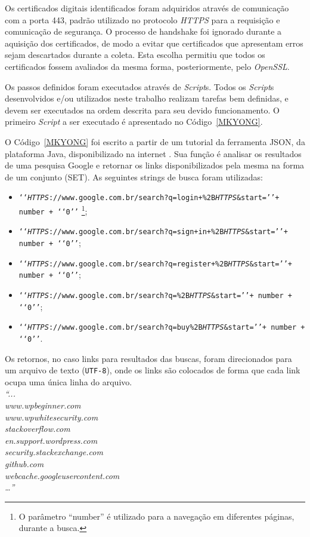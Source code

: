 		Os certificados digitais  identificados foram adquiridos através de comunicação com a porta 443, padrão utilizado no protocolo \textit{HTTPS} para a requisição e comunicação de segurança. O processo de handshake foi ignorado durante a aquisição dos certificados, de modo a evitar que certificados que apresentam erros sejam descartados durante a coleta. Esta escolha permitiu que todos os certificados fossem avaliados da mesma forma, posteriormente, pelo \textit{OpenSSL}.
		
		Os passos definidos foram executados através de \textit{Script}s. Todos os \textit{Script}s desenvolvidos e/ou utilizados neste trabalho realizam tarefas bem definidas, e devem ser  executados na ordem descrita para seu devido funcionamento. O primeiro \textit{Script} a ser executado é apresentado no Código~\ref{MKYONG}.
		
		
		O Código~\ref{MKYONG} foi escrito a partir de um tutorial da ferramenta JSON, da plataforma Java, disponibilizado na internet \cite{mkyong_url}. Sua função é analisar os resultados de uma pesquisa Google e retornar os links disponibilizados pela mesma na forma de um conjunto (SET). As seguintes strings de busca foram utilizadas:
		
		\begin{itemize}
			\item \texttt{\lq\lq \textit{HTTPS}://www.google.com.br/search?q=login+\%2B\textit{HTTPS}\&start=\rq\rq + number + \lq\lq0\rq\rq} \footnote{O parâmetro “number” é utilizado para a navegação em diferentes páginas, durante a busca.};
			\item \texttt{\lq\lq \textit{HTTPS}://www.google.com.br/search?q=sign+in+\%2B\textit{HTTPS}\&start=\rq\rq + number + \lq\lq0\rq\rq};
			\item \texttt{\lq\lq \textit{HTTPS}://www.google.com.br/search?q=register+\%2B\textit{HTTPS}\&start=\rq\rq + number + \lq\lq0\rq\rq};
			\item \texttt{\lq\lq \textit{HTTPS}://www.google.com.br/search?q=\%2B\textit{HTTPS}\&start=\rq\rq + number + \lq\lq0\rq\rq};
			\item \texttt{\lq\lq \textit{HTTPS}://www.google.com.br/search?q=buy\%2B\textit{HTTPS}\&start=\rq\rq + number + \lq\lq0\rq\rq}.
		\end{itemize}
		
		
		Os retornos, no caso links para resultados das buscas, foram direcionados para um arquivo de texto (\texttt{UTF-8}), onde os links são colocados de forma que cada link ocupa uma única linha do arquivo.\\
		\textit{“...\\
		www.wpbeginner.com\\
		www.wpwhitesecurity.com\\
		stackoverflow.com\\
		en.support.wordpress.com\\
		security.stackexchange.com\\
		github.com\\
		webcache.googleusercontent.com\\
		…”}
	
